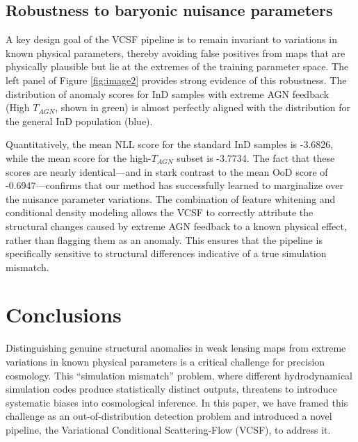 \documentclass[]{article}
\begin{document}
\subsection{Robustness to baryonic nuisance parameters}
A key design goal of the VCSF pipeline is to remain invariant to variations in known physical parameters, thereby avoiding false positives from maps that are physically plausible but lie at the extremes of the training parameter space. The left panel of Figure \ref{fig:image2} provides strong evidence of this robustness. The distribution of anomaly scores for InD samples with extreme AGN feedback (High $T_{AGN}$, shown in green) is almost perfectly aligned with the distribution for the general InD population (blue).

Quantitatively, the mean NLL score for the standard InD samples is -3.6826, while the mean score for the high-$T_{AGN}$ subset is -3.7734. The fact that these scores are nearly identical—and in stark contrast to the mean OoD score of -0.6947—confirms that our method has successfully learned to marginalize over the nuisance parameter variations. The combination of feature whitening and conditional density modeling allows the VCSF to correctly attribute the structural changes caused by extreme AGN feedback to a known physical effect, rather than flagging them as an anomaly. This ensures that the pipeline is specifically sensitive to structural differences indicative of a true simulation mismatch.

\section{Conclusions}
\label{sec:conclusions}


Distinguishing genuine structural anomalies in weak lensing maps from extreme variations in known physical parameters is a critical challenge for precision cosmology. This ``simulation mismatch'' problem, where different hydrodynamical simulation codes produce statistically distinct outputs, threatens to introduce systematic biases into cosmological inference. In this paper, we have framed this challenge as an out-of-distribution detection problem and introduced a novel pipeline, the Variational Conditional Scattering-Flow (VCSF), to address it.
\end{document}
